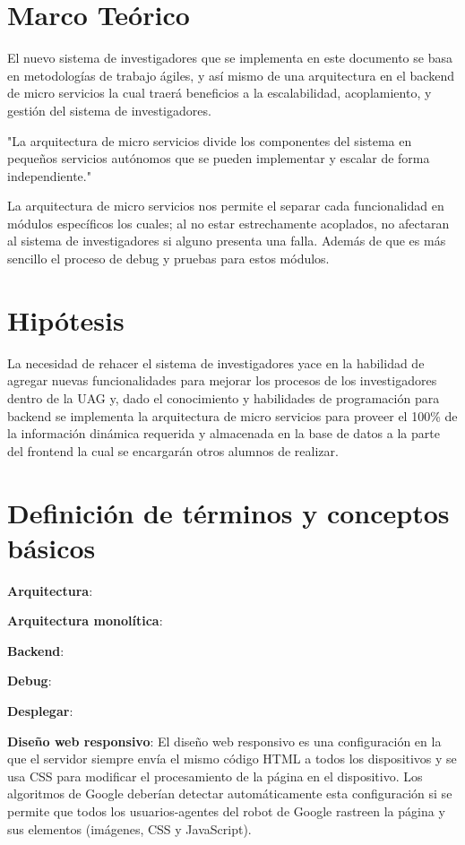 \section{Marco Teórico}

    El nuevo sistema de investigadores que se implementa en este documento se basa en metodologías de trabajo ágiles, y así mismo de una arquitectura en el backend de micro servicios la cual traerá beneficios a la escalabilidad, acoplamiento, y gestión del sistema de investigadores.
    
    "La arquitectura de micro servicios divide los componentes del sistema en pequeños servicios autónomos que se pueden implementar y escalar de forma independiente."\cite{KryptonSolid}

    La arquitectura de micro servicios nos permite el separar cada funcionalidad en módulos específicos los cuales; al no estar estrechamente acoplados, no afectaran al sistema de investigadores si alguno presenta una falla. Además de que es más sencillo el proceso de debug y pruebas para estos módulos.

\section{Hipótesis}

    La necesidad de rehacer el sistema de investigadores yace en la habilidad de agregar nuevas funcionalidades para mejorar los procesos de los investigadores dentro de la UAG y, dado el conocimiento y habilidades de programación para backend se implementa la arquitectura de micro servicios para proveer el 100\% de la información dinámica requerida y almacenada en la base de datos a la parte del frontend la cual se encargarán otros alumnos de realizar.

\section{Definición de términos y conceptos básicos}

    \textbf{Arquitectura}: 
    
    \textbf{Arquitectura monolítica}:

    \textbf{Backend}:
    
    \textbf{Debug}:
    
    \textbf{Desplegar}: 
    
    \textbf{Diseño web responsivo}: El diseño web responsivo es una configuración en la que el servidor siempre envía el mismo código HTML a todos los dispositivos y se usa CSS para modificar el procesamiento de la página en el dispositivo. Los algoritmos de Google deberían detectar automáticamente esta configuración si se permite que todos los usuarios-agentes del robot de Google rastreen la página y sus elementos (imágenes, CSS y JavaScript). \cite{GoogleResponsivo}
    
